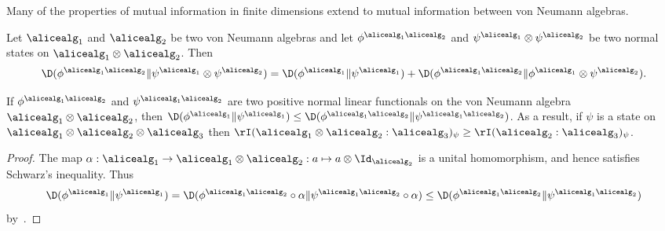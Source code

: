 Many of the properties of mutual information in finite dimensions extend to mutual information between von Neumann algebras. 
\begin{proposition}  \label{prop:entropy_tensor}
	Let $\alicealg_1$ and $\alicealg_2$ be two von Neumann algebras and let $\phi^{\alicealg_1 \alicealg_2}$ and $\psi^{\alicealg_1}\otimes \psi^{\alicealg_2}$ be two normal states on $\alicealg_1 \otimes \alicealg_2$. Then
	\begin{equation*}
		\D(\phi^{\alicealg_1 \alicealg_2} \| \psi^{\alicealg_1}\otimes \psi^{\alicealg_2}) = \D(\phi^{\alicealg_1} \| \psi^{\alicealg_1}) + \D( \phi^{\alicealg_1 \alicealg_2} \| \phi^{\alicealg_1} \otimes \psi^{\alicealg_2}).
	\end{equation*}
\end{proposition}
\begin{proposition}[Monotonicity]\label{prop:divergence_data_processing}
	If $\phi^{\alicealg_1 \alicealg_2}$ and  $\psi^{\alicealg_1 \alicealg_2}$ are two positive normal linear functionals on the von Neumann algebra $\alicealg_1 \otimes \alicealg_2$, then $\D(\phi^{\alicealg_1} \| \psi^{\alicealg_1} ) \leq \D(\phi^{\alicealg_1 \alicealg_2} \| \psi^{\alicealg_1 \alicealg_2} )$. As a result, if $\psi$ is a state on $\alicealg_1 \otimes \alicealg_2 \otimes \alicealg_3$ then $\rI(\alicealg_1 \otimes \alicealg_2 : \alicealg_3)_{\psi}
	\geq \rI(\alicealg_2 : \alicealg_3)_{\psi}$. 
\end{proposition}
\begin{proof}
	The map $\alpha:\alicealg_1 \rightarrow \alicealg_1 \otimes \alicealg_2 : a \mapsto a \otimes \Id_{\alicealg_2}$ is a unital homomorphism, and hence satisfies Schwarz's inequality. Thus
	\begin{equation*}
		\D (\phi^{\alicealg_1} \| \psi^{\alicealg_1} ) = \D (\phi^{\alicealg_1 \alicealg_2} \circ \alpha \| \psi^{\alicealg_1 \alicealg_2} \circ \alpha ) \leq \D (\phi^{\alicealg_1 \alicealg_2} \| \psi^{\alicealg_1 \alicealg_2})
	\end{equation*}
	by~. 
\end{proof}


